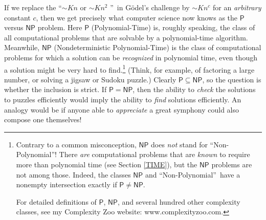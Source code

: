 \documentclass[12pt,onecolumn]{article}%
\begin{document}
If we replace the \textquotedblleft$\sim Kn$ or $\sim Kn^{2}$%
\textquotedblright\  in G\"{o}del's challenge by $\sim Kn^{c}$ for an
\textit{arbitrary} constant $c$, then we get precisely what computer science
now knows as the $\mathsf{P}$ versus $\mathsf{NP}$ problem. Here
$\mathsf{P}$ (Polynomial-Time) is, roughly speaking, the class of all
computational problems that are solvable by a polynomial-time algorithm.
 Meanwhile, $\mathsf{NP}$ (Nondeterministic Polynomial-Time) is the class of
computational problems for which a solution can be \textit{recognized} in
polynomial time, even though a solution might be very hard to
find.\footnote{Contrary to a common misconception, $\mathsf{NP}$ does
\textit{not} stand for \textquotedblleft Non-Polynomial\textquotedblright !
 There \textit{are} computational problems that are \textit{known} to require
more than polynomial time (see Section \ref{TIME}), but the $\mathsf{NP}%
$ problems are not among those. Indeed, the classes $\mathsf{NP}$ and
\textquotedblleft Non-Polynomial\textquotedblright\  have a nonempty
intersection exactly if $\mathsf{P}\neq\mathsf{NP}$.
\par
For detailed definitions of $\mathsf{P}$, $\mathsf{NP}$, and several hundred
other complexity classes, see my Complexity Zoo website:
www.complexityzoo.com.} (Think, for example, of factoring a large number, or
solving a jigsaw or Sudoku puzzle.) Clearly $\mathsf{P}\subseteq\mathsf{NP}%
$, so the question is whether the inclusion is strict. If $\mathsf{P}%
=\mathsf{NP}$, then the ability to \textit{check} the solutions to puzzles
efficiently would imply the ability to \textit{find} solutions efficiently.
 An analogy would be if anyone able to \textit{appreciate} a great symphony
could also compose one themselves!
\end{document}
